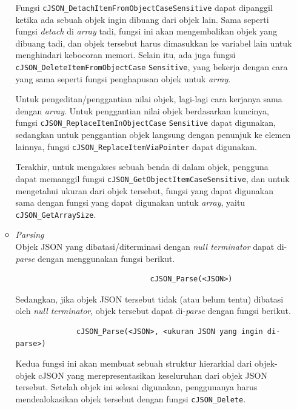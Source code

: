 \documentclass[a4paper,twoside]{article}
\begin{document}
\begin{enumerate}
\begin{itemize}
	Fungsi \verb|cJSON_DetachItemFromObjectCaseSensitive| dapat dipanggil ketika ada sebuah objek ingin dibuang dari objek lain. Sama seperti fungsi \textit{detach} di \textit{array} tadi, fungsi ini akan mengembalikan objek yang dibuang tadi, dan objek tersebut harus dimasukkan ke variabel lain untuk menghindari kebocoran memori. Selain itu, ada juga fungsi \verb|cJSON_DeleteItemFromObjectCase| \linebreak \verb|Sensitive|, yang bekerja dengan cara yang sama seperti fungsi penghapusan objek untuk \textit{array}.
	
	Untuk pengeditan/penggantian nilai objek, lagi-lagi cara kerjanya sama dengan \textit{array}. Untuk penggantian nilai objek berdasarkan kuncinya, fungsi \verb|cJSON_ReplaceItemInObjectCase| \linebreak \verb|Sensitive| dapat digunakan, sedangkan untuk penggantian objek langsung dengan penunjuk ke elemen lainnya, fungsi \verb|cJSON_ReplaceItemViaPointer| dapat digunakan.
	
	Terakhir, untuk mengakses sebuah benda di dalam objek, pengguna dapat memanggil \mbox{fungsi} \verb|cJSON_GetObjectItemCaseSensitive|, dan untuk mengetahui ukuran dari objek tersebut, fungsi yang dapat digunakan sama dengan fungsi yang dapat digunakan untuk \textit{array}, yaitu \linebreak \verb|cJSON_GetArraySize|.
	
	\item \textit{Parsing}\\
	Objek JSON yang dibatasi/diterminasi dengan \textit{null terminator} dapat di-\textit{parse} dengan \linebreak menggunakan fungsi berikut.
	
	\begin{verbatim}
                               cJSON_Parse(<JSON>)
	\end{verbatim}
	
	Sedangkan, jika objek JSON tersebut tidak (atau belum tentu) dibatasi oleh \textit{null terminator}, objek tersebut dapat di-\textit{parse} dengan fungsi berikut.
	
	\begin{verbatim}
              cJSON_Parse(<JSON>, <ukuran JSON yang ingin di-parse>)
	\end{verbatim}
	
	Kedua fungsi ini akan membuat sebuah struktur hierarkial dari objek-objek cJSON yang \linebreak merepresentasikan keseluruhan dari objek JSON tersebut. Setelah objek ini selesai digunakan, penggunanya harus mendealokasikan objek tersebut dengan fungsi \verb|cJSON_Delete|.
\end{itemize}


\end{enumerate}
\end{document}
